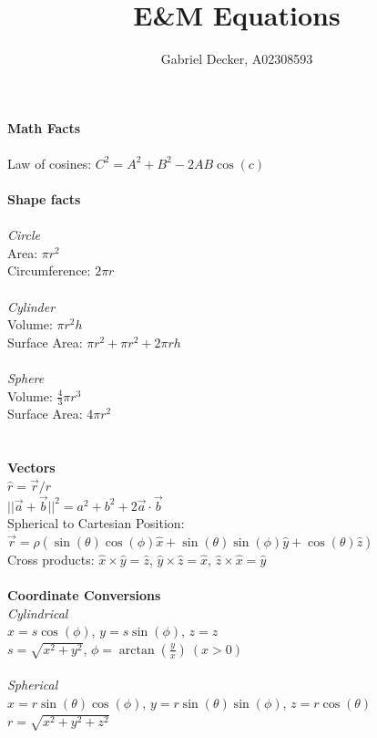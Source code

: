 \documentclass[12pt]{article}
\title{E\&M Equations}
\author{Gabriel Decker, A02308593}
\newcommand{\ds}{\displaystyle}
\begin{document}
\maketitle
\begin{flushleft}


\textbf{Math Facts}\\~\\
Law of cosines: $\ds C^2=A^2+B^2-2AB\cos(c)$\\~\\

\textbf{Shape facts}\\~\\
\textit{Circle}\\
Area: $\pi r^2$\\
Circumference: $2\pi r$\\~\\

\textit{Cylinder}\\
Volume: $\pi r^2h$\\
Surface Area: $\pi r^2+\pi r^2+2\pi rh$\\~\\

\textit{Sphere}\\
Volume: $\frac{4}{3}\pi r^3$\\
Surface Area: $4\pi r^2$\\~\\~\\

\textbf{Vectors}\\
$\hat{r}=\vec{r}/r$\\
$||\vec{a}+\vec{b}||^2=a^2+b^2+2\vec{a}\cdot\vec{b}$\\
Spherical to Cartesian Position: $\vec{r}=\rho(\sin(\theta)\cos(\phi)\hat{x}+\sin(\theta)\sin(\phi)\hat{y}+\cos(\theta)\hat{z})$\\
Cross products: $\hat{x}\times\hat{y}=\hat{z}$, $\hat{y}\times\hat{z}=\hat{x}$, $\hat{z}\times\hat{x}=\hat{y}$\\~\\

\textbf{Coordinate Conversions}\\
\textit{Cylindrical}\\
$x=s\cos(\phi)$, $y=s\sin(\phi)$, $z=z$\\
$s=\sqrt{x^2+y^2}$, $\phi=\arctan(\frac{y}{x})\ (x>0)$\\~\\

\textit{Spherical}\\
$x=r\sin(\theta)\cos(\phi)$, $y=r\sin(\theta)\sin(\phi)$, $z=r\cos(\theta)$\\
$r=\sqrt{x^2+y^2+z^2}$\\~\\



\end{flushleft}
\end{document}
